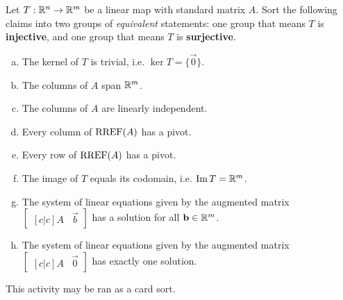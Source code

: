 \begin{fact}
\begin{center}
\end{center}
\end{fact}

\begin{activity}{15}
Let $T: \mathbb{R}^n \rightarrow \mathbb{R}^m$ be a linear map with standard matrix $A$.
Sort the following claims into two groups of \textit{equivalent} statements:
one group that means \(T\) is \textbf{injective}, and one group that means
\(T\) is \textbf{surjective}.
\begin{multicols}{2}
\begin{enumerate}[(a)]
\item The kernel of \(T\) is trivial, i.e. \(\ker T=\{\vec 0\}\).
\item The columns of $A$ span $\mathbb{R}^m$.
\item The columns of $A$ are linearly independent.
\item Every column of $\operatorname{RREF}(A)$ has a pivot.
\item Every row of $\operatorname{RREF}(A)$ has a pivot.
\item The image of \(T\) equals its codomain, i.e. \(\operatorname{Im} T=\mathbb{R}^m\).
\item The system of linear equations given by the augmented matrix $\begin{bmatrix}[c|c]A & \vec{b} \end{bmatrix}$ has a solution for all $\mathbf{b} \in \mathbb{R}^m$.
\item The system of linear equations given by the augmented matrix $\begin{bmatrix}[c|c] A & \vec{0} \end{bmatrix}$ has exactly one solution.
\end{enumerate}
\end{multicols}
\begin{instructorNote}
  This activity may be ran as a card sort.
\end{instructorNote}
\end{activity}

